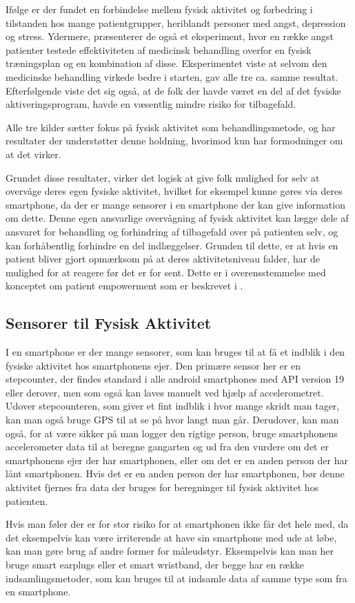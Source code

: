 Ifølge \citet{book:sportPsyc} er der fundet en forbindelse mellem fysisk aktivitet og forbedring i tilstanden hos mange patientgrupper, heriblandt personer med angst, depression og stress.
Ydermere, præsenterer de også et eksperiment, hvor en række angst patienter testede effektiviteten af medicinsk behandling overfor en fysisk træningsplan og en kombination af disse.
Eksperimentet viste at selvom den medicinske behandling virkede bedre i starten, gav alle tre ca. samme resultat.
Efterfølgende viste det sig også, at de folk der havde været en del af det fysiske aktiveringsprogram, havde en væsentlig mindre risiko for tilbagefald.

Alle tre kilder sætter fokus på fysisk aktivitet som behandlingsmetode, \citet{art:physMental} og \citet{book:sportPsyc} har resultater der understøtter denne holdning, hvorimod \citet{misc:healthReports} kun har formodninger om at det virker.

Grundet disse resultater, virker det logisk at give folk mulighed for selv at overvåge deres egen fysiske aktivitet, hvilket for eksempel kunne gøres via deres smartphone, da der er mange sensorer i en smartphone der kan give information om dette.
Denne egen ansvarlige overvågning af fysisk aktivitet kan lægge dele af ansvaret for behandling og forhindring af tilbagefald over på patienten selv, og kan forhåbentlig forhindre en del indlæggelser.
Grunden til dette, er at hvis en patient bliver gjort opmærksom på at deres aktivitetsniveau falder, har de mulighed for at reagere før det er for sent.
Dette er i overensstemmelse med konceptet om patient empowerment som er beskrevet i \citep[Kapitel 1, Sektion 6.1]{misc:faellesrapp}. 

\subsection{Sensorer til Fysisk Aktivitet}
I en smartphone er der mange sensorer, som kan bruges til at få et indblik i den fysiske aktivitet hos smartphonens ejer.
Den primære sensor her er en stepcounter, der findes standard i alle android smartphones med API version 19 eller derover, men som også kan laves manuelt ved hjælp af accelerometret.
Udover stepcounteren, som giver et fint indblik i hvor mange skridt man tager, kan man også bruge GPS til at se på hvor langt man går.
Derudover, kan man også, for at være sikker på man logger den rigtige person, bruge smartphonens accelerometer data til at beregne gangarten \citep{4272626} og ud fra den vurdere om det er smartphonens ejer der har smartphonen, eller om det er en anden person der har lånt smartphonen.
Hvis det er en anden person der har smartphonen, bør denne aktivitet fjernes fra data der bruges for beregninger til fysisk aktivitet hos patienten.

Hvis man føler der er for stor risiko for at smartphonen ikke får det hele med, da det eksempelvis kan være irriterende at have sin smartphone med ude at løbe, kan man gøre brug af andre former for måleudstyr.
Eksempelvis kan man her bruge smart earplugs eller et smart wristband, der begge har en række indsamlingsmetoder, som kan bruges til at indsamle data af samme type som fra en smartphone.
